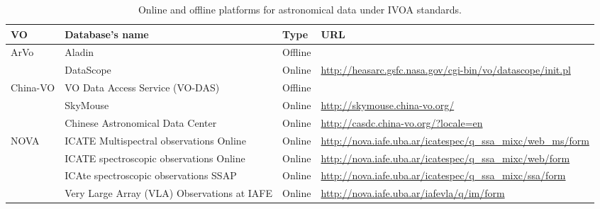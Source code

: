 \begin{table}%
\centering
\begin{tabular}{|m{2cm}|m{4.5cm}|m{1.5cm}|m{6cm}|}
    \hline
    \textbf{VO} & \textbf{Database's name} & \textbf{Type} & \textbf{URL}
    \\
    \hline
    \multirow{2}{*}{ArVo} & Aladin & Offline & \\
    \cline{2-4}
     & DataScope & Online 
     & \url{http://heasarc.gsfc.nasa.gov/cgi-bin/vo/datascope/init.pl} \\
     \hline
    \multirow{3}{*}{China-VO} & VO Data Access Service (VO-DAS) & Offline & \\
    \cline{2-4}
     & SkyMouse & Online & \url{http://skymouse.china-vo.org/} \\
     \cline{2-4}
     & Chinese Astronomical Data Center & Online 
     & \url{http://casdc.china-vo.org/?locale=en} \\
     \hline
    \multirow{4}{*}{NOVA} & ICATE Multispectral observations Online & Online 
    & \url{http://nova.iafe.uba.ar/icatespec/q_ssa_mixc/web_ms/form} \\
    \cline{2-4}
     & ICATE spectroscopic observations Online & Online
     & \url{http://nova.iafe.uba.ar/icatespec/q_ssa_mixc/web/form} \\
     \cline{2-4}
     & ICAte spectroscopic observations SSAP & Online
     & \url{http://nova.iafe.uba.ar/icatespec/q_ssa_mixc/ssa/form} \\
     \cline{2-4}
     & Very Large Array (VLA) Observations at IAFE & Online 
     & \url{http://nova.iafe.uba.ar/iafevla/q/im/form} \\
     \hline
\end{tabular}
\caption{Online and offline platforms for astronomical data under IVOA
         standards.}
\label{table:vo_platforms}
\end{table}
